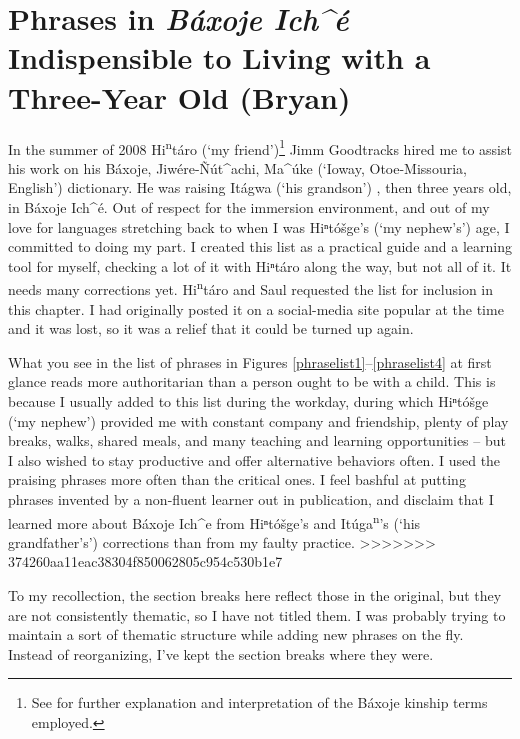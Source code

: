 \documentclass[output=paper]{LSP/langsci}
\begin{document}
\section{Phrases in \emph{B\'axoje Ich\^{ }\'e} Indispensible to Living with a Three-Year Old (Bryan)}
	In the summer of 2008 Hi\textsuperscript{n}t\'aro (`my friend')\footnote{See  for further explanation and interpretation of the Báxoje kinship terms employed.} Jimm Goodtracks hired me to assist his work on his B\'axoje, Jiw\'ere-\~N\'ut\^{ }achi, Ma\^{ }\'uke (`Ioway, Otoe-Missouria, English') dictionary. He was raising It\'agwa (`his grandson') , then three years old, in B\'axoje Ich\^{ }\'e. Out of respect for the immersion environment, and out of my love for languages stretching back to when I was Hiⁿtóšge's (`my nephew's') age, I committed to doing my part. I created this list as a practical guide and a learning tool for myself, checking a lot of it with Hiⁿtáro along the way, but not all of it. It needs many corrections yet. Hi\textsuperscript{n}t\'aro and Saul requested the list for inclusion in this chapter. I had originally posted it on a social-media site popular at the time and it was lost, so it was a relief that it could be turned up again. 

What you see in the list of phrases in Figures \ref{phraselist1}--\ref{phraselist4} at first glance reads more authoritarian than a person ought to be with a child. This is because I usually added to this list during the workday, during which Hiⁿtóšge (`my nephew') provided me with constant company and friendship, plenty of play breaks, walks, shared meals, and many teaching and learning opportunities -- but I also wished to stay productive and offer alternative behaviors often. I used the praising phrases more often than the critical ones. I feel bashful at putting phrases invented by a non-fluent learner out in publication, and disclaim that I learned more about B\'axoje Ich\^{ }e from Hiⁿtóšge's and It\'uga\textsuperscript{n}'s (`his grandfather's') corrections than from my faulty practice. 
>>>>>>> 374260aa11eac38304f850062805c954c530b1e7

To my recollection, the section breaks here reflect those in the original, but they are not consistently thematic, so I have not titled them. I was probably trying to maintain a sort of thematic structure while adding new phrases on the fly. Instead of reorganizing, I've kept the section breaks where they were.
\end{document}
